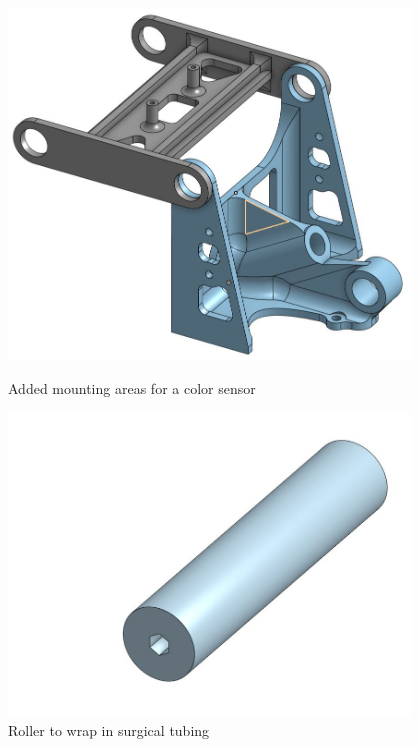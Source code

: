 \begin{figure}[ht]
\centering
\begin{minipage}[b]{.48\textwidth}
  \centering
  \includegraphics[width=0.95\textwidth]{Meetings/November/11-22-21/11-22-21_CAD_Figure1 - Nathan Forrer.JPG}
  \caption{Added mounting areas for a color sensor}
  \label{fig:pic1}
\end{minipage}%
\hfill%
\begin{minipage}[b]{.48\textwidth}
  \centering
  \includegraphics[width=0.95\textwidth]{Meetings/November/11-22-21/11-22-21_CAD_Figure2 - Nathan Forrer.JPG}
  \caption{Roller to wrap in surgical tubing}
  \label{fig:pic2}
\end{minipage}
\end{figure}

